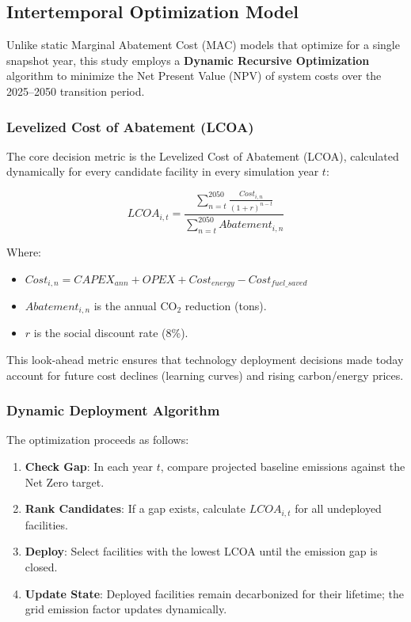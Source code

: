 \documentclass[12pt,a4paper]{article}
\begin{document}
\subsection{Intertemporal Optimization Model}

Unlike static Marginal Abatement Cost (MAC) models that optimize for a single snapshot year, this study employs a \textbf{Dynamic Recursive Optimization} algorithm to minimize the Net Present Value (NPV) of system costs over the 2025--2050 transition period.

\subsubsection{Levelized Cost of Abatement (LCOA)}
The core decision metric is the Levelized Cost of Abatement (LCOA), calculated dynamically for every candidate facility in every simulation year $t$:

\begin{equation}
LCOA_{i,t} = \frac{\sum_{n=t}^{2050} \frac{Cost_{i,n}}{(1+r)^{n-t}}}{\sum_{n=t}^{2050} Abatement_{i,n}}
\end{equation}

Where:
\begin{itemize}
    \item $Cost_{i,n} = CAPEX_{ann} + OPEX + Cost_{energy} - Cost_{fuel\_saved}$
    \item $Abatement_{i,n}$ is the annual CO$_2$ reduction (tons).
    \item $r$ is the social discount rate (8\%).
\end{itemize}

This look-ahead metric ensures that technology deployment decisions made today account for future cost declines (learning curves) and rising carbon/energy prices.

\subsubsection{Dynamic Deployment Algorithm}
The optimization proceeds as follows:
\begin{enumerate}
    \item \textbf{Check Gap}: In each year $t$, compare projected baseline emissions against the Net Zero target.
    \item \textbf{Rank Candidates}: If a gap exists, calculate $LCOA_{i,t}$ for all undeployed facilities.
    \item \textbf{Deploy}: Select facilities with the lowest LCOA until the emission gap is closed.
    \item \textbf{Update State}: Deployed facilities remain decarbonized for their lifetime; the grid emission factor updates dynamically.
\end{enumerate}
\end{document}
